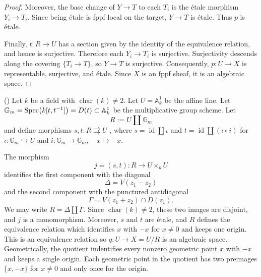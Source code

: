 \begin{proof}
	Moreover, the base change of $Y\to T$ to each $T_i$
	is the étale morphism $Y_i\to T_i$.
	Since being étale is fppf local on the target,
	$Y\to T$ is étale. Thus $p$ is étale.
	
	Finally, $t:R\to U$ has a section given by the identity
	of the equivalence relation, and hence is surjective.
	Therefore each $Y_i\to T_i$ is surjective.
	Surjectivity descends along the covering
	$\{T_i\to T\}$, so $Y\to T$ is surjective.
	Consequently, $p:U\to X$ is representable, surjective,
	and étale. Since $X$ is an fppf sheaf, it is an
	algebraic space.
\end{proof}


\begin{example}
	(\cite[][Tag 02Z1]{stacks-project})
	Let $k$ be a field with \(\operatorname{char}(k)\neq 2\). Let $U = \mathbb{A}_k^1$ be the affine line. Let $\mathbb{G}_m = \operatorname{Spec}\!\left(k[t, t^{-1}]\right) = D(t) \subset \mathbb{A}_k^1$ be the multiplicative group scheme. Let 
	\[
		R:=U\coprod\mathbb{G}_m
	\]
	and define morphisms $s,t:R\rightrightarrows U$ , where $s = \operatorname{id} \coprod \iota$ and $t = \operatorname{id} \coprod (\iota \circ i)$ for $\iota: \mathbb{G}_m \hookrightarrow U$ and $i: \mathbb{G}_m \to \mathbb{G}_m, \quad x\mapsto -x$.
	
	The morphism
	\[
	j=(s,t):R\longrightarrow U\times_k U
	\]
	identifies the first component with the diagonal
	\[
	\Delta=V(z_1-z_2)
	\]
	and the second component with the punctured antidiagonal
	\[
	\Gamma=V(z_1+z_2)\cap D(z_1).
	\]
	We may write $R=\Delta\coprod\Gamma$. Since $\operatorname{char}(k)\neq 2$, these two images are disjoint, and $j$ is a monomorphism.
	Moreover, $s$ and $t$ are étale, and $R$ defines the
	equivalence relation which identifies $x$ with $-x$ for $x\neq 0$ and keeps one origin. This is an equivalence relation so $q: U \to X = U/R$ is an algebraic space. 
	Geometrically, the quotient indentifies every nonzero geometric point $x$ with $-x$ and keeps a single origin. Each geometric point in the quotient has two preimages $\{x, -x\}$ for $x\neq 0$ and only once for the origin.
		
	
	
	\begin{center}
\end{center}
\end{example}
